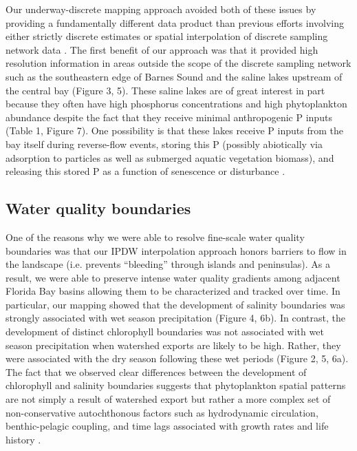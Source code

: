 \documentclass[review]{elsarticle}
\begin{document}
Our underway-discrete mapping approach avoided both of these issues by providing a fundamentally different data product than previous efforts involving either strictly discrete estimates or spatial interpolation of discrete sampling network data \citep{fourqurean1993process}. The first benefit of our approach was that it provided high resolution information in areas outside the scope of the discrete sampling network such as the southeastern edge of Barnes Sound and the saline lakes upstream of the central bay (Figure 3, 5). These saline lakes are of great interest in part because they often have high phosphorus concentrations and high phytoplankton abundance despite the fact that they receive minimal anthropogenic P inputs (Table 1, Figure 7). One possibility is that these lakes receive P inputs from the bay itself during reverse-flow events, storing this P (possibly abiotically via adsorption to particles as well as submerged aquatic vegetation biomass), and releasing this stored P as a function of senescence or disturbance \citep{rudnick1999phosphorus}.

\subsection{Water quality boundaries}

One of the reasons why we were able to resolve fine-scale water quality boundaries was that our IPDW interpolation approach honors barriers to flow in the landscape (i.e. prevents “bleeding” through islands and peninsulas). As a result, we were able to preserve intense water quality gradients among adjacent Florida Bay basins allowing them to be characterized and tracked over time. In particular, our mapping showed that the development of salinity boundaries was strongly associated with wet season precipitation (Figure 4, 6b). In contrast, the development of distinct chlorophyll boundaries was not associated with wet season precipitation when watershed exports are likely to be high. Rather, they were associated with the dry season following these wet periods (Figure 2, 5, 6a). The fact that we observed clear differences between the development of chlorophyll and salinity boundaries suggests that phytoplankton spatial patterns are not simply a result of watershed export but rather a more complex set of non-conservative autochthonous factors such as hydrodynamic circulation, benthic-pelagic coupling, and time lags associated with growth rates and life history \citep[Figure 6;][]{zhang_2014, lawrence2004wind}.
\end{document}
